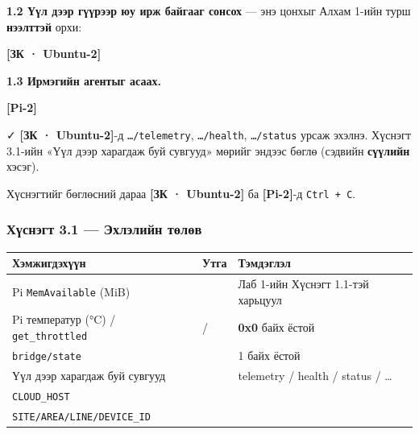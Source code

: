 \textbf{1.2 Үүл дээр гүүрээр юу ирж байгааг сонсох} --- энэ цонхыг Алхам 1-ийн турш \textbf{нээлттэй} орхи:

\textbf{{[}ЗК · Ubuntu-2{]}}

\begin{Shaded}
\begin{Highlighting}[]
\end{Highlighting}
\end{Shaded}

\textbf{1.3 Ирмэгийн агентыг асаах.}

\textbf{{[}Pi-2{]}}

\begin{Shaded}
\begin{Highlighting}[]
\KeywordTok{\&\&} 
\end{Highlighting}
\end{Shaded}

✓ \textbf{{[}ЗК · Ubuntu-2{]}}-д \texttt{\ldots{}/\allowbreak{}telemetry}, \texttt{\ldots{}/health}, \texttt{\ldots{}/status} урсаж эхэлнэ. Хүснэгт 3.1-ийн «Үүл дээр харагдаж буй сувгууд» мөрийг эндээс бөглө (сэдвийн \textbf{сүүлийн} хэсэг).

Хүснэгтийг бөглөсний дараа \textbf{{[}ЗК · Ubuntu-2{]}} ба \textbf{{[}Pi-2{]}}-д \texttt{Ctrl\ +\ C}.

\hypertarget{ux445ux4afux441ux43dux44dux433ux442-3.1-ux44dux445ux43bux44dux43bux438ux439ux43d-ux442ux4e9ux43bux4e9ux432}{%
\subsubsection{Хүснэгт 3.1 --- Эхлэлийн төлөв}\label{ux445ux4afux441ux43dux44dux433ux442-3.1-ux44dux445ux43bux44dux43bux438ux439ux43d-ux442ux4e9ux43bux4e9ux432}}

\begingroup\scriptsize\begin{longtable}[]{@{}lll@{}}
\toprule
Хэмжигдэхүүн & Утга & Тэмдэглэл\tabularnewline
\midrule
\endhead
Pi \texttt{MemAvailable} (MiB) & & Лаб 1-ийн Хүснэгт 1.1-тэй харьцуул\tabularnewline
Pi температур (°C) / \texttt{get\_throttled} & / & \textbf{0x0} байх ёстой\tabularnewline
\texttt{bridge/state} & & 1 байх ёстой\tabularnewline
Үүл дээр харагдаж буй сувгууд & & telemetry / health / status / \ldots{}\tabularnewline
\texttt{CLOUD\_HOST} & &\tabularnewline
\texttt{SITE/\allowbreak{}AREA/\allowbreak{}LINE/\allowbreak{}DEVICE\_\allowbreak{}ID} & &\tabularnewline
\bottomrule
\end{longtable}\endgroup

